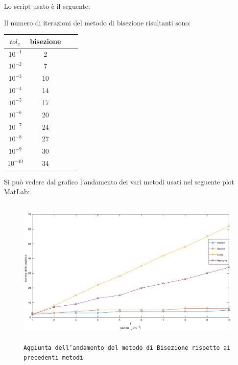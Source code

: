 \begin{flushleft}
Lo script usato è il seguente:


Il numero di iterazioni del metodo di bisezione risultanti sono:

\begin{center}
\begin{tabular}{|c|c|c|c|}
\hline
$tol_x$ & bisezione \\
\hline
$10^{-1}$ & 2 \\
$10^{-2}$ & 7 \\
$10^{-3}$ & 10 \\
$10^{-4}$ & 14 \\
$10^{-5}$ & 17 \\
$10^{-6}$ & 20 \\
$10^{-7}$ & 24 \\
$10^{-8}$ & 27 \\
$10^{-9}$ & 30 \\
$10^{-10}$ & 34 \\
\hline
\end{tabular}
\end{center}

Si può vedere dal grafico l'andamento dei vari metodi usati nel seguente plot MatLab:
\begin{figure}[H]
\label{fes27}
\includegraphics[width=480px, height=280px]{plot/fes27}
\caption{\texttt{Aggiunta dell'andamento del metodo di Bisezione rispetto ai precedenti metodi}}
\end{figure}

\end{flushleft}
